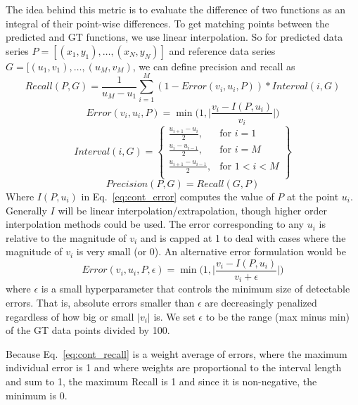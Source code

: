 \documentclass[a4paper,11pt]{scrartcl}
\begin{document}
The idea behind this metric is to evaluate the difference of two functions as an integral of their point-wise differences.
To get matching points between the predicted and GT functions, we use linear interpolation.
So for predicted data series $P = [(x_1, y_1), \dots, (x_N, y_N)]$ and reference data series  $G = [(u_1, v_1), \dots, (u_M, v_M)$, we can define precision and recall as
\begin{equation} \label{eq:cont_recall}
Recall(P, G) = \frac{1}{u_M - u_1}
\sum_{i=1}^M (1 - Error(v_i, u_i, P)) * Interval(i, G)  
\end{equation}
\begin{equation} \label{eq:cont_error}
 Error(v_i, u_i, P) = \min \Big(1, \Big| \frac{v_i - I(P, u_i)}{v_i} \Big|\Big)
\end{equation}
\begin{equation} \label{eq:cont_interval}
Interval(i, G) = \left\{\begin{array}{lr}
				 \frac{u_{i+1} - u_{i}}{2}, & \text{for } i = 1 \\
				 \frac{u_{i} - u_{i-1}}{2}, & \text{for } i = M \\
				 \frac{u_{i+1} - u_{i-1}}{2} , & \text{for } 1 < i < M \\
				 \end{array}\right\}
\end{equation}
\begin{equation} \label{eq:cont_precision}
Precision(P, G) = Recall(G, P)
\end{equation}
Where $I(P, u_i)$ in Eq.~\ref{eq:cont_error} computes the value of $P$ at the point $u_i$.
Generally $I$ will be linear interpolation/extrapolation, though higher order interpolation methods could be used.
The error corresponding to any $u_i$ is relative to the magnitude of $v_i$ and is capped at 1 to deal with cases where the magnitude of $v_i$ is very small (or 0).
An alternative error formulation would be
\begin{equation} \label{eq:cont_error_alt}
 Error(v_i, u_i, P, \epsilon) = \min \Big(1, \Big| \frac{v_i - I(P, u_i)}{v_i + \epsilon} \Big|\Big)
\end{equation}
where $\epsilon$ is a small hyperparameter that controls the minimum size of detectable errors.
That is, absolute errors smaller than $\epsilon$ are decreasingly penalized regardless of how big or small $|v_i|$ is.
We set $\epsilon$ to be the range (max minus min) of the GT data points divided by 100.


Because Eq.~\ref{eq:cont_recall} is a weight average of errors, where the maximum individual error is 1 and where weights are proportional to the interval length and sum to 1, the maximum Recall is 1 and since it is non-negative, the minimum is 0.
\end{document}
